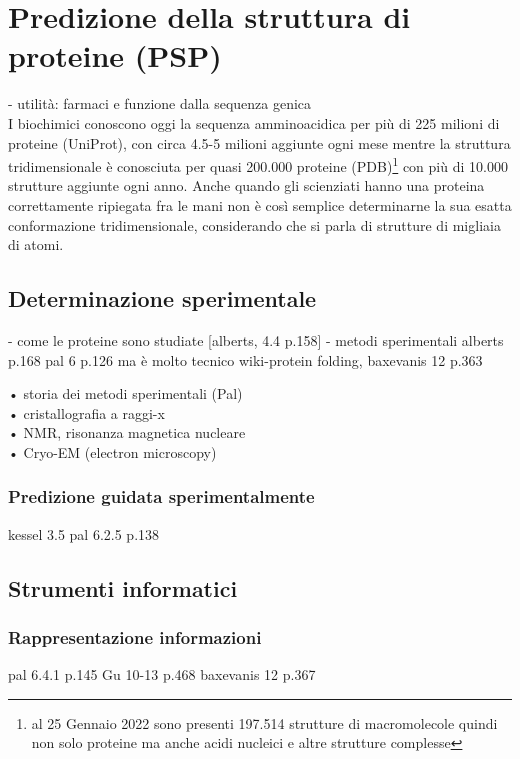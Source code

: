 \chapter{Predizione della struttura di proteine (PSP)}

- utilità: farmaci e funzione dalla sequenza genica \\

I biochimici conoscono oggi la sequenza amminoacidica per più di 225 milioni di proteine\supercite{proteienDBentries} (UniProt), con circa 4.5-5 milioni aggiunte ogni mese mentre la struttura tridimensionale è conosciuta per quasi 200.000 proteine\supercite{proteienDBentries} (PDB)\footnote{al 25 Gennaio 2022 sono presenti 197.514 strutture di macromolecole quindi non solo proteine ma anche acidi nucleici e altre strutture complesse\supercite{pdbStats}} con più di 10.000 strutture aggiunte ogni anno. Anche quando gli scienziati hanno una proteina correttamente ripiegata fra le mani non è così semplice determinarne la sua esatta conformazione tridimensionale, considerando che si parla di strutture di migliaia di atomi.

\par 

\section{Determinazione sperimentale}

- come le proteine sono studiate [alberts, 4.4 p.158]
- metodi sperimentali 
alberts p.168
pal 6 p.126 ma è molto tecnico
wiki-protein folding, 
baxevanis 12 p.363

• storia dei metodi sperimentali (Pal) \\
• cristallografia a raggi-x \\
• NMR, risonanza magnetica nucleare \\
• Cryo-EM (electron microscopy) \\
\subsection{Predizione guidata sperimentalmente}
kessel 3.5
pal 6.2.5 p.138

\section{Strumenti informatici}

\subsection{Rappresentazione informazioni}
pal 6.4.1 p.145
Gu 10-13 p.468
baxevanis 12 p.367

